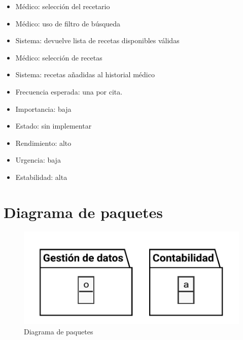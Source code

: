 \documentclass[11pt,a4paper]{article}
\begin{document}

\newpage

\begin{itemize}
	\item Médico: selección del recetario
	\item Médico: uso de filtro de búsqueda
	\item Sistema: devuelve lista de recetas disponibles válidas
	\item Médico: selección de recetas
	\item Sistema: recetas añadidas al historial médico
\end{itemize}


\begin{itemize}
	\item Frecuencia esperada: una por cita.
	\item Importancia: baja
	\item Estado: sin implementar
	\item Rendimiento: alto
	\item Urgencia: baja
	\item Estabilidad: alta
\end{itemize}



\newpage
\section{Diagrama de paquetes}

\begin{figure}[H]
	\caption{Diagrama de paquetes}
	\centering
	\includegraphics{diagramas/paquetes}
\end{figure}
	
	
\end{document}
